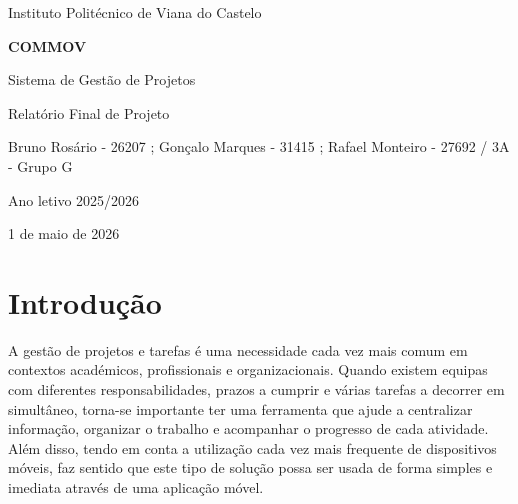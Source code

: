 \documentclass[12pt,a4paper]{article}
\begin{document}
\begin{titlepage}
    \centering

    \vspace*{2cm}

    {\Large Instituto Politécnico de Viana do Castelo\par}

    \vspace{1.5cm}

    {\Huge\bfseries COMMOV\par}

    \vspace{0.5cm}

    {\LARGE Sistema de Gestão de Projetos\par}

    \vspace{1cm}

    {\Large Relatório Final de Projeto\par}

    \vfill

    {\large Bruno Rosário - 26207 ; Gonçalo Marques - 31415 ; Rafael Monteiro - 27692 / 3A - Grupo G\par}

    \vspace{0.5cm}

    {\large Ano letivo 2025/2026\par}

    \vspace{0.5cm}

    {\large 1 de maio de 2026\par}

\end{titlepage}

\tableofcontents
\newpage

\section{Introdução}

A gestão de projetos e tarefas é uma necessidade cada vez mais comum em contextos académicos, profissionais e organizacionais. Quando existem equipas com diferentes responsabilidades, prazos a cumprir e várias tarefas a decorrer em simultâneo, torna-se importante ter uma ferramenta que ajude a centralizar informação, organizar o trabalho e acompanhar o progresso de cada atividade. Além disso, tendo em conta a utilização cada vez mais frequente de dispositivos móveis, faz sentido que este tipo de solução possa ser usada de forma simples e imediata através de uma aplicação móvel.
\end{document}
